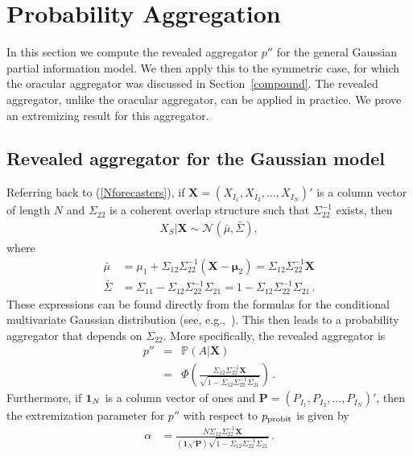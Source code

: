 \documentclass[11pt]{article}
\renewcommand{\P}{\mathbb{P}}
\theoremstyle{definition}
\theoremstyle{definition}
\def\one{{\bf 1}}
\def\P{{\mathbb P}}
\def\probit{p_{\rm probit}}
\begin{document}
\section{Probability Aggregation}
\label{aggregation}

In this section we compute the revealed aggregator $p''$ for 
the general Gaussian partial information model.  We then apply 
this to the symmetric case, for which the oracular aggregator 
was discussed in Section~\ref{compound}.  The revealed aggregator, 
unlike the oracular aggregator, can be applied in practice.  
We prove an extremizing result for this aggregator.

\subsection{Revealed aggregator for the Gaussian model}

Referring back to (\ref{Nforecasters}), if $\boldsymbol{X} = 
(X_{I_1}, X_{I_2},  \dots, X_{I_N})'$ is a column vector 
of length $N$ and $\Sigma_{22}$ is a coherent overlap structure 
such that $\Sigma_{22}^{-1}$ exists, then 
\begin{align*}
X_{S} | \boldsymbol{X} \sim \mathcal{N}\left(\bar{\mu}, \bar{\Sigma}\right), 
\end{align*}
where
\begin{align*}
\bar{\mu} &= \mu_1 + \Sigma_{12} \Sigma_{22}^{-1} 
  (\boldsymbol{X} - \boldsymbol{\mu}_2) 
  = \Sigma_{12} \Sigma_{22}^{-1} \boldsymbol{X} \\
 \bar{\Sigma}&= \Sigma_{11} - \Sigma_{12} \Sigma_{22}^{-1} \Sigma_{21} 
 = 1 - \Sigma_{12} \Sigma_{22}^{-1} \Sigma_{21}   \, .
\end{align*}
These expressions can be found directly from the formulas for
the conditional multivariate Gaussian distribution (see, 
e.g.,~\citealt[Result~5.2.10, page~156]{ravishanker2001first}). 
This then leads to a probability aggregator that depends on 
$\Sigma_{22}$.  More specifically, the revealed aggregator is
\begin{eqnarray}
p'' & = & \P\left(A  | \boldsymbol{X}\right)  \nonumber \\
&=& \Phi\left( \frac{\Sigma_{12} \Sigma_{22}^{-1} \boldsymbol{X}}
   {\sqrt{1 - \Sigma_{12} \Sigma_{22}^{-1} \Sigma_{21}}}\right) 
\label{GeneralAggregator} \, .
\end{eqnarray}
Furthermore, if $\one_N$ is a column vector of ones and 
$\boldsymbol{P} = (P_{I_1}, P_{I_2}, \dots, P_{I_N})'$, 
then the extremization parameter for $p''$ with respect to
$\probit$ is given by 
\begin{align*}
\alpha  &= \frac{N \Sigma_{12} \Sigma_{22}^{-1} 
  \boldsymbol{X}}{\left(\boldsymbol{1}_N' \boldsymbol{P} \right) 
  \sqrt{1 - \Sigma_{12} \Sigma_{22}^{-1} \Sigma_{21}}}  \, .
\end{align*}
\end{document}
